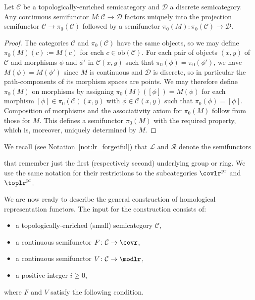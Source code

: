 \documentclass[AHL,Unicode,published]{cedram}
\newcommand{\obj}{\ensuremath{\mathrm{ob}}}
\newcommand{\pr}{\ensuremath{\mathrm{pr}}}
\newcommand{\Rings}{\ensuremath{\mathrm{Rings}}}
\newcommand{\groups}{\ensuremath{\mathrm{Grp}}}
\newcommand{\sR}{\mathscr{R}}
\newcommand{\sL}{\mathscr{L}}
\newcommand{\cC}{\mathcal{C}}
\newcommand{\cD}{\mathcal{D}}
\renewcommand{\geq}{\geqslant}
\begin{document}
\begin{lemm}\label{lem:factorisation_pi_{0}}
Let $\cC$ be a topologically-enriched semicategory and $\cD$ a discrete semicategory. Any continuous semifunctor $M\colon \cC \to \cD$ factors uniquely into the projection semifunctor $\cC \to \pi_{0}(\cC)$ followed by a semifunctor $\pi_{0}(M)\colon\pi_{0}(\cC) \to \cD$.
\end{lemm}
\begin{proof}
The categories $\cC$ and $\pi_{0}(\cC)$ have the same objects, so we may define $\pi_{0}(M)(c):=M(c)$ for each $c\in\obj(\cC)$. For each pair of objects $(x,y)$ of $\cC$ and morphisms $\phi$ and $\phi'$ in $\cC(x,y)$ such that $\pi_{0}(\phi)=\pi_{0}(\phi')$, we have $M(\phi)=M(\phi')$ since $M$ is continuous and $\cD$ is discrete, so in particular the path-components of its morphism spaces are points. We may therefore define $\pi_{0}(M)$ on morphisms by assigning $\pi_{0}(M)([\phi])=M(\phi)$ for each morphism $[\phi]\in\pi_{0}(\cC)(x,y)$ with $\phi\in\cC(x,y)$ such that $\pi_{0}(\phi)=[\phi]$. Composition of morphisms and the associativity axiom for $\pi_{0}(M)$ follow from those for $M$. This defines a semifunctor $\pi_{0}(M)$ with the required property, which is, moreover, uniquely determined by $M$.
\end{proof}

We recall (see Notation~\ref{not:lr_forgetful}) that $\sL$ and $\sR$ denote the semifunctors
\begin{center}
\end{center} that remember just the first (respectively second) underlying group or ring. We use the same notation for their restrictions to the subcategories $\covlr^{\pr}$ and $\toplr^{\pr}$.

We are now ready to describe the general construction of homological representation functors. The input for the construction consists of:
\begin{itemize}
\item[$\circ$] a topologically-enriched (small) semicategory $\cC$,
\item[$\circ$] a continuous semifunctor $F \colon \cC \to \covr$,
\item[$\circ$] a continuous semifunctor $V \colon \cC \to \modlr$,
\item[$\circ$] a positive integer $i\geq 0$,
\end{itemize}
where $F$ and $V$ satisfy the following condition.
\end{document}
